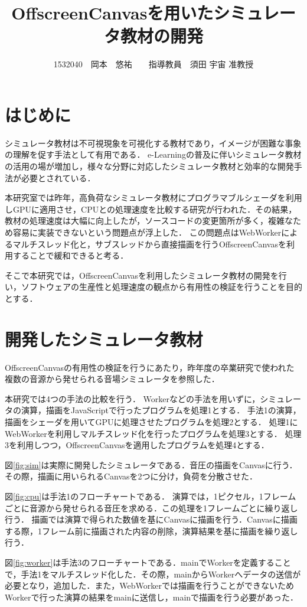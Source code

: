 \documentclass[twocolumn,10pt,a4j]{jsarticle}
\title{OffscreenCanvasを用いたシミュレータ教材の開発}
\author{1532040　岡本　悠祐　　指導教員　須田 宇宙 准教授}
\date{}
\begin{document}
\maketitle
\section{はじめに}
シミュレータ教材は不可視現象を可視化する教材であり，イメージが困難な事象の理解を促す手法として有用である．
e-Learningの普及に伴いシミュレータ教材の活用の場が増加し，様々な分野に対応したシミュレータ教材と効率的な開発手法が必要とされている．

本研究室では昨年，高負荷なシミュレータ教材にプログラマブルシェーダを利用しGPUに適用させ，CPUとの処理速度を比較する研究が行われた\cite{book}．その結果，教材の処理速度は大幅に向上したが，ソースコードの変更箇所が多く，複雑なため容易に実装できないという問題点が浮上した．
この問題点はWebWorkerによるマルチスレッド化と，サブスレッドから直接描画を行うOffscreenCanvasを利用することで緩和できると考る．

そこで本研究では，OffscreenCanvasを利用したシミュレータ教材の開発を行い，ソフトウェアの生産性と処理速度の観点から有用性の検証を行うことを目的とする．

\section{開発したシミュレータ教材}
OffscreenCanvasの有用性の検証を行うにあたり，昨年度の卒業研究で使われた複数の音源から発せられる音場シミュレータを参照した．

本研究では4つの手法の比較を行う．
Workerなどの手法を用いずに，シミュレータの演算，描画をJavaScriptで行ったプログラムを処理1とする．
手法1の演算，描画をシェーダを用いてGPUに処理させたプログラムを処理2とする．
処理1にWebWorkerを利用しマルチスレッド化を行ったプログラムを処理3とする．
処理3を利用しつつ，OffscreenCanvasを適用したプログラムを処理4とする．

図\ref{fig:sim}は実際に開発したシミュレータである．音圧の描画をCanvasに行う．その際，描画に用いられるCanvasを2つに分け，負荷を分散させた．

図\ref{fig:cpu}は手法1のフローチャートである．
演算では，1ピクセル，1フレームごとに音源から発せられる音圧を求める．この処理を1フレームごとに繰り返し行う．
描画では演算で得られた数値を基にCanvasに描画を行う．Canvasに描画する際，1フレーム前に描画された内容の削除，演算結果を基に描画を繰り返し行う．

図\ref{fig:worker}は手法3のフローチャートである．mainでWorkerを定義することで，手法1をマルチスレッド化した．その際，mainからWorkerへデータの送信が必要となり，追加した．また，WebWorkerでは描画を行うことができないためWorkerで行った演算の結果をmainに送信し，mainで描画を行う必要があった．
\end{document}
